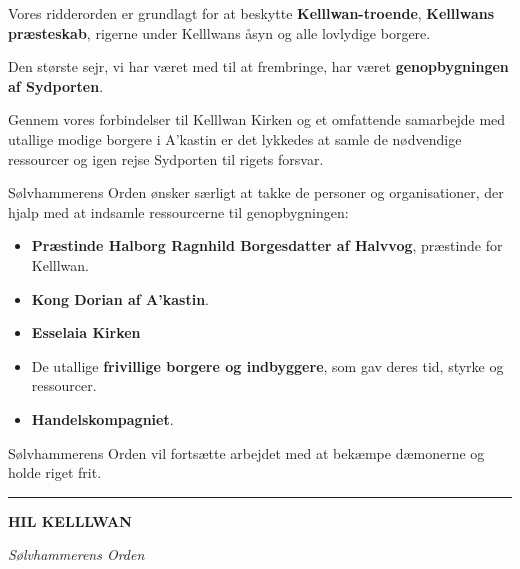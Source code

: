 \documentclass[a5paper,10pt,twoside,openany]{memoir}
\begin{document}
\begin{center}
\begin{tcolorbox}
Vores ridderorden er grundlagt for at beskytte
\textbf{Kelllwan-troende}, \textbf{Kelllwans præsteskab},
rigerne under Kelllwans åsyn og alle lovlydige borgere.

Den største sejr, vi har været med til at frembringe, har været
\textbf{genopbygningen af Sydporten}.

Gennem vores forbindelser til Kelllwan Kirken og et omfattende
samarbejde med utallige modige borgere i A'kastin er det
lykkedes at samle de nødvendige ressourcer og igen rejse
Sydporten til rigets forsvar.

\vspace{0.5em}

\begin{tcolorbox}[
  colback=Goldenrod!7,
  colframe=Goldenrod!65!black,
  boxrule=0.8pt,
  sharp corners,
  title={\sffamily\bfseries EN SÆRLIG TAK},
  colbacktitle=black!85,
  coltitle=white,
  fontupper=\small,
  left=4mm,
  right=4mm,
  top=3mm,
  bottom=3mm
]

Sølvhammerens Orden ønsker særligt at takke de personer og
organisationer, der hjalp med at indsamle ressourcerne til
genopbygningen:

\begin{itemize}
  \setlength{\itemsep}{0.35em}

  \item \textbf{Præstinde Halborg Ragnhild Borgesdatter af Halvvog},
        præstinde for Kelllwan.

  \item \textbf{Kong Dorian af A'kastin}.

  \item \textbf{Esselaia Kirken}

  \item De utallige \textbf{frivillige borgere og indbyggere},
        som gav deres tid, styrke og ressourcer.

  \item \textbf{Handelskompagniet}.
\end{itemize}

\end{tcolorbox}

\vspace{0.6em}

Sølvhammerens Orden vil fortsætte arbejdet med at bekæmpe
dæmonerne og holde riget frit.

\vspace{0.8em}

\begin{center}

{\color{Goldenrod!75!black}
\rule{0.55\linewidth}{1pt}}

\vspace{0.5em}

{\sffamily\bfseries\Large
HIL KELLLWAN}

\vspace{0.25em}

{\sffamily\small\itshape
Sølvhammerens Orden}

\end{center}

\end{tcolorbox}
\end{center}
\end{document}
